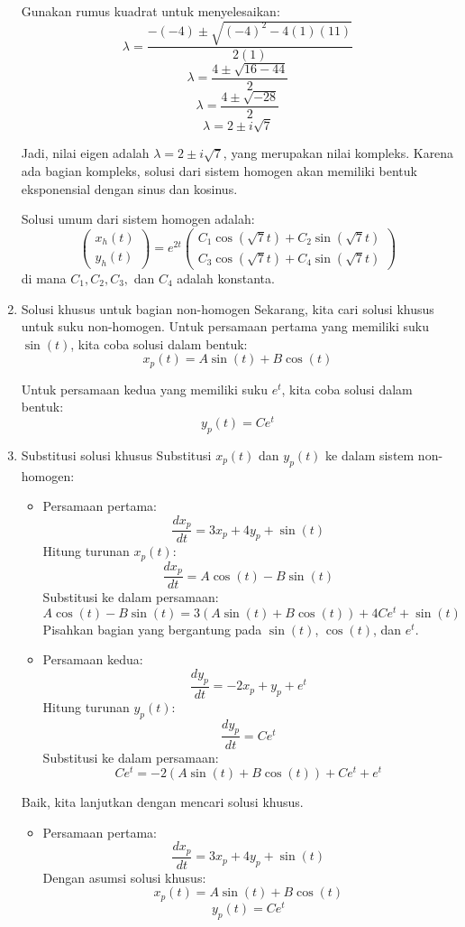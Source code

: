 \documentclass{article}
\begin{document}
\begin{enumerate}[label=(\arabic*)]
    Gunakan rumus kuadrat untuk menyelesaikan:
    \[
    \lambda = \frac{-(-4) \pm \sqrt{(-4)^2 - 4(1)(11)}}{2(1)}
    \]
    \[
    \lambda = \frac{4 \pm \sqrt{16 - 44}}{2}
    \]
    \[
    \lambda = \frac{4 \pm \sqrt{-28}}{2}
    \]
    \[
    \lambda = 2 \pm i\sqrt{7}
    \]
    
    Jadi, nilai eigen adalah \(\lambda = 2 \pm i\sqrt{7}\), yang merupakan nilai kompleks. Karena ada bagian kompleks, solusi dari sistem homogen akan memiliki bentuk eksponensial dengan sinus dan kosinus.

    Solusi umum dari sistem homogen adalah:
    \[
    \begin{pmatrix} x_h(t) \\ y_h(t) \end{pmatrix} = e^{2t} \begin{pmatrix} C_1 \cos(\sqrt{7}t) + C_2 \sin(\sqrt{7}t) \\ C_3 \cos(\sqrt{7}t) + C_4 \sin(\sqrt{7}t) \end{pmatrix}
    \]
    di mana \(C_1, C_2, C_3,\) dan \(C_4\) adalah konstanta.
    
    \item Solusi khusus untuk bagian non-homogen
    Sekarang, kita cari solusi khusus untuk suku non-homogen. Untuk persamaan pertama yang memiliki suku \(\sin(t)\), kita coba solusi dalam bentuk:
    \[
    x_p(t) = A \sin(t) + B \cos(t)
    \]
    
    Untuk persamaan kedua yang memiliki suku \(e^t\), kita coba solusi dalam bentuk:
    \[
    y_p(t) = C e^t
    \]
    
    \item Substitusi solusi khusus
    Substitusi \(x_p(t)\) dan \(y_p(t)\) ke dalam sistem non-homogen:
    
    \begin{itemize}
        \item Persamaan pertama:
        \[
        \frac{dx_p}{dt} = 3x_p + 4y_p + \sin(t)
        \]
        Hitung turunan \(x_p(t)\):
        \[
        \frac{dx_p}{dt} = A \cos(t) - B \sin(t)
        \]
        Substitusi ke dalam persamaan:
        \[
        A \cos(t) - B \sin(t) = 3(A \sin(t) + B \cos(t)) + 4C e^t + \sin(t)
        \]
        Pisahkan bagian yang bergantung pada \(\sin(t)\), \(\cos(t)\), dan \(e^t\).
     
        \item Persamaan kedua:
        \[
        \frac{dy_p}{dt} = -2x_p + y_p + e^t
        \]
        Hitung turunan \(y_p(t)\):
        \[
        \frac{dy_p}{dt} = C e^t
        \]
        Substitusi ke dalam persamaan:
        \[
        C e^t = -2(A \sin(t) + B \cos(t)) + C e^t + e^t
        \]
    \end{itemize}
    Baik, kita lanjutkan dengan mencari solusi khusus.
\begin{itemize}
    \item Persamaan pertama:
    \[
    \frac{dx_p}{dt} = 3x_p + 4y_p + \sin(t)
    \]
    Dengan asumsi solusi khusus:
    \[
    x_p(t) = A \sin(t) + B \cos(t)
    \]
    \[
    y_p(t) = C e^t
    \]
    

\end{itemize}
\end{enumerate}
\end{document}
